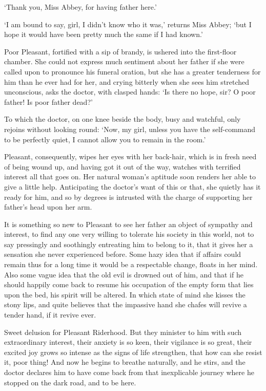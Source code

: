 ‘Thank you, Miss Abbey, for having father here.’

‘I am bound to say, girl, I didn’t know who it was,’ returns Miss Abbey;
‘but I hope it would have been pretty much the same if I had known.’

Poor Pleasant, fortified with a sip of brandy, is ushered into the
first-floor chamber. She could not express much sentiment about her
father if she were called upon to pronounce his funeral oration, but she
has a greater tenderness for him than he ever had for her, and crying
bitterly when she sees him stretched unconscious, asks the doctor, with
clasped hands: ‘Is there no hope, sir? O poor father! Is poor father
dead?’

To which the doctor, on one knee beside the body, busy and watchful,
only rejoins without looking round: ‘Now, my girl, unless you have the
self-command to be perfectly quiet, I cannot allow you to remain in the
room.’

Pleasant, consequently, wipes her eyes with her back-hair, which is in
fresh need of being wound up, and having got it out of the way, watches
with terrified interest all that goes on. Her natural woman’s aptitude
soon renders her able to give a little help. Anticipating the doctor’s
want of this or that, she quietly has it ready for him, and so by
degrees is intrusted with the charge of supporting her father’s head
upon her arm.

It is something so new to Pleasant to see her father an object of
sympathy and interest, to find any one very willing to tolerate his
society in this world, not to say pressingly and soothingly entreating
him to belong to it, that it gives her a sensation she never experienced
before. Some hazy idea that if affairs could remain thus for a long time
it would be a respectable change, floats in her mind. Also some vague
idea that the old evil is drowned out of him, and that if he should
happily come back to resume his occupation of the empty form that lies
upon the bed, his spirit will be altered. In which state of mind she
kisses the stony lips, and quite believes that the impassive hand she
chafes will revive a tender hand, if it revive ever.

Sweet delusion for Pleasant Riderhood. But they minister to him with
such extraordinary interest, their anxiety is so keen, their vigilance
is so great, their excited joy grows so intense as the signs of life
strengthen, that how can she resist it, poor thing! And now he begins
to breathe naturally, and he stirs, and the doctor declares him to have
come back from that inexplicable journey where he stopped on the dark
road, and to be here.

